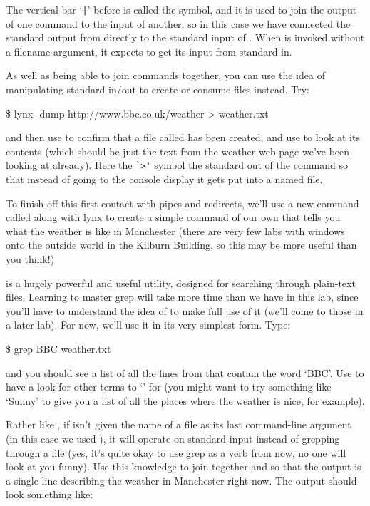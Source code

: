The vertical bar `\verb-|-' before  is called the  symbol, and it is used to join the output of one command to the input of another; so in this case we have connected the standard output from  directly to the standard input of . When  is invoked without a filename argument, it expects to get its input from standard in.

As well as being  able to join commands together, you can use the idea of manipulating standard in/out to create or consume files instead. Try:

\begin{ttoutenv}
\$ lynx -dump http://www.bbc.co.uk/weather > weather.txt
\end{ttoutenv}

and then use  to confirm that a file called  has been created, and use  to look at its contents (which should be just the text from the weather web-page we've been looking at already). Here the \verb-`>'- symbol  the standard out of the  command so that instead of going to the console display it gets put into a named file. 

To finish off this first contact with pipes and redirects, we'll use a new command called  along with lynx to create a simple command of our own that tells you what the weather is like in Manchester (there are very few labs with windows onto the outside world in the Kilburn Building, so this may be more useful than you think!) 

 is a hugely powerful and useful utility, designed for searching through plain-text files. Learning to master grep will take more time than we have in this lab, since you'll have to understand the idea of  to make full use of it (we'll come to those in a later lab). For now, we'll use it in its very simplest form. Type:

\begin{ttoutenv}
\$ grep BBC weather.txt
\end{ttoutenv}

and you should see a list of all the lines from  that contain the word `BBC'. Use  to have a look for other terms to `' for (you might want to try something like `Sunny' to give you a list of all the places where the weather is nice, for example). 

Rather like , if  isn't given the name of a file as its last command-line argument (in this case we used ), it will operate on standard-input instead of grepping through a file (yes, it's quite okay to use grep as a verb from now, no one will look at you funny). Use this knowledge to join together  and  so that the output is a single line describing the weather in Manchester right now. The output should look something like:

